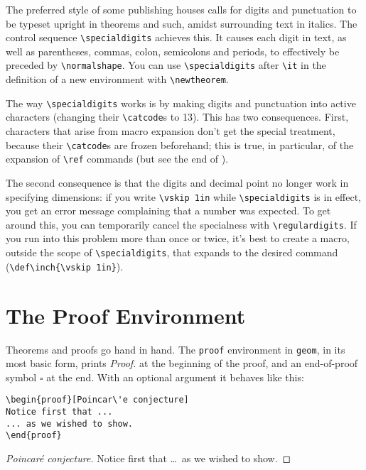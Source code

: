 The preferred style of some publishing houses calls for digits and
punctuation to be typeset upright in theorems and such, amidst
surrounding text in italics.  The control sequence
\verb+\specialdigits+ achieves this.  It causes each digit in text, as
well as parentheses, commas, colon, semicolons and periods, to
effectively be preceded by \verb+\normalshape+.  You can use
\verb+\specialdigits+ after \verb+\it+ in the definition of a new
environment with \verb+\newtheorem+.

\begin{wizard}
The way \verb+\specialdigits+ works is by making digits and
punctuation into active characters (changing their \verb+\catcode+s to
13). This has two consequences.  First, characters that arise from
macro expansion don't get the special treatment, because their
\verb+\catcode+s are frozen beforehand; this is true, in particular,
of the expansion of \verb+\ref+ commands (but see the end of
).

The second consequence is that the digits and decimal point no longer
work in specifying dimensions: if you write \verb+\vskip 1in+ while
\verb+\specialdigits+ is in effect, you get an error message
complaining that a number was expected.  To get around this, you can
temporarily cancel the specialness with \verb+\regulardigits+.  If you
run into this problem more than once or twice, it's best to create a
macro, outside the scope of \verb+\specialdigits+, that expands to the
desired command (\verb+\def\inch{\vskip 1in}+).
\end{wizard}

\section{The Proof Environment}

Theorems and proofs go hand in hand.  
The \verb+proof+ environment in \verb+geom+, in its most basic form,
prints {\it Proof.} at the beginning of the proof, and an end-of-proof
symbol $\square$ at the end.  With an optional argument it behaves
like this: 
%
\begin{verbatim}
\begin{proof}[Poincar\'e conjecture]
Notice first that ...
... as we wished to show.
\end{proof}
\end{verbatim}
%
\begin{proof}[Poincar\'e conjecture]
Notice first that \dots\ as we wished to show.
\end{proof}

